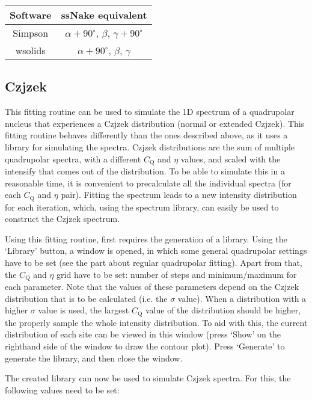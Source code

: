 \documentclass[11pt,a4paper]{article}
\begin{document}
\begin{center}
\begin{tabular}{cc}
\toprule
\textbf{Software} & \textbf{ssNake equivalent}\\
\midrule
Simpson & $\alpha + 90^\circ$, $\beta$, $\gamma + 90^\circ$ \\
wsolids & $\alpha + 90^\circ$, $\beta$, $\gamma$ \\
\bottomrule
\end{tabular}
\end{center}


\subsection{Czjzek}
This fitting routine can be used to simulate the 1D spectrum of a quadrupolar nucleus that
experiences a Czjzek distribution (normal or extended Czjzek). This fitting routine behaves
differently than the ones described above, as it uses a library for simulating the spectra. Czjzek
distributions are the sum of multiple quadrupolar spectra, with a different $C_\text{Q}$ and $\eta$
values, and scaled with the intensify that comes out of the distribution. To be able to simulate
this in a reasonable time, it is convenient to precalculate all the individual spectra (for each
$C_\text{Q}$ and $\eta$ pair). Fitting the spectrum leads to a new intensity distribution for each
iteration, which, using the spectrum library, can easily be used to construct the Czjzek spectrum.

Using this fitting routine, first requires the generation of a library. Using the `Library'
button, a window is opened, in which some general quadrupolar settings have to be set (see the part
about regular quadrupolar fitting). Apart from that, the $C_\text{Q}$ and $\eta$ grid have to be
set: number of steps and minimum/maximum for each parameter. Note that the values of these parameters
depend on the Czjzek distribution that is to be calculated (i.e. the $\sigma$ value). When a
distribution with a higher $\sigma$ value is used, the largest $C_\text{Q}$ value of the distribution
should be higher, the properly sample the whole intensity distribution. To aid with this, the
current distribution of each site can be viewed in this window (press `Show' on the righthand side
of the window to draw the contour plot). Press `Generate' to generate the library, and then close
the window.

The created library can now be used to simulate Czjzek spectra. For this, the following values need
to be set:
\end{document}
